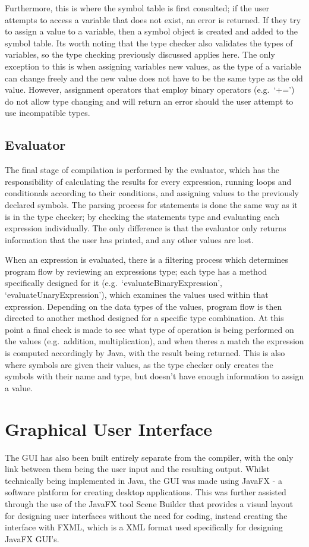 \documentclass[
]{report}
\begin{document}
Furthermore, this is where the symbol table is first consulted; if the
user attempts to access a variable that does not exist, an error is
returned. If they try to assign a value to a variable, then a symbol
object is created and added to the symbol table. Its worth noting that
the type checker also validates the types of variables, so the type
checking previously discussed applies here. The only exception to this
is when assigning variables new values, as the type of a variable can
change freely and the new value does not have to be the same type as the
old value. However, assignment operators that employ binary operators
(e.g.~`+=') do not allow type changing and will return an error should
the user attempt to use incompatible types.

\subsection{Evaluator}
The final stage of compilation is performed by the evaluator, which has
the responsibility of calculating the results for every expression,
running loops and conditionals according to their conditions, and
assigning values to the previously declared symbols. The parsing process
for statements is done the same way as it is in the type checker; by
checking the statements type and evaluating each expression
individually. The only difference is that the evaluator only returns
information that the user has printed, and any other values are lost.

When an expression is evaluated, there is a filtering process which
determines program flow by reviewing an expressions type; each type has
a method specifically designed for it (e.g.~`evaluateBinaryExpression',
`evaluateUnaryExpression'), which examines the values used within that
expression. Depending on the data types of the values, program flow is
then directed to another method designed for a specific type
combination. At this point a final check is made to see what type of
operation is being performed on the values (e.g.~addition,
multiplication), and when theres a match the expression is computed
accordingly by Java, with the result being returned. This is also where
symbols are given their values, as the type checker only creates the
symbols with their name and type, but doesn't have enough information to
assign a value.

\section{Graphical User Interface}
The GUI has also been built entirely separate from the compiler, with
the only link between them being the user input and the resulting
output. Whilst technically being implemented in Java, the GUI was made
using JavaFX - a software platform for creating desktop applications.
This was further assisted through the use of the JavaFX tool Scene
Builder that provides a visual layout for designing user interfaces
without the need for coding, instead creating the interface with FXML,
which is a XML format used specifically for designing JavaFX GUI's.
\end{document}
